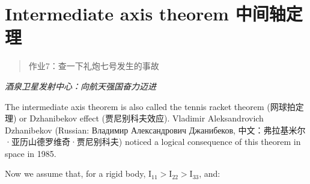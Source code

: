 \section{Intermediate axis theorem
中间轴定理}\label{intermediate-axis-theorem-ux4e2dux95f4ux8f74ux5b9aux7406}

\begin{quote}
作业7：查一下礼炮七号发生的事故
\end{quote}

\emph{酒泉卫星发射中心：向航天强国奋力迈进}

The intermediate axis theorem is also called the tennis racket theorem
(网球拍定理) or Dzhanibekov effect (贾尼别科夫效应). Vladimir
Aleksandrovich Dzhanibekov (Russian: Владимир Александрович Джанибеков,
中文：弗拉基米尔·亚历山德罗维奇·贾尼别科夫) noticed a logical
consequence of this theorem in space in 1985.

Now we assume that, for a rigid body,
\(\mathrm I_{11} > \mathrm I_{22} > \mathrm I_{33}\), and:

